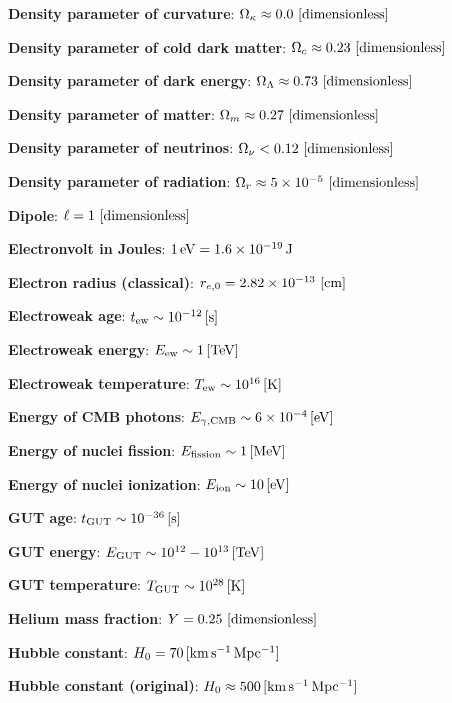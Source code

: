 \documentclass[a4paper,10pt]{article}
\begin{document}
{\noindent}\textbf{Density parameter of curvature}: $\Omega_\kappa \approx 0.0 ~ [{\rm dimensionless}]$

{\noindent}\textbf{Density parameter of cold dark matter}: $\Omega_c \approx 0.23 ~ [{\rm dimensionless}]$

{\noindent}\textbf{Density parameter of dark energy}: $\Omega_\Lambda \approx 0.73 ~ [{\rm dimensionless}]$

{\noindent}\textbf{Density parameter of matter}: $\Omega_m \approx 0.27 ~ [{\rm dimensionless}]$

{\noindent}\textbf{Density parameter of neutrinos}: $\Omega_\nu < 0.12 ~ [{\rm dimensionless}]$

{\noindent}\textbf{Density parameter of radiation}: $\Omega_r \approx 5\times10^{-5} ~ [{\rm dimensionless}]$

{\noindent}\textbf{Dipole}: $\ell=1 ~ [{\rm dimensionless}]$

{\noindent}\textbf{Electronvolt in Joules}: $1\,{\rm eV} = 1.6\times10^{-19}\,{\rm J}$

{\noindent}\textbf{Electron radius (classical)}: $r_{e,0}=2.82\times10^{-13} ~ [{\rm cm}]$

{\noindent}\textbf{Electroweak age}: $t_\mathrm{ew} \sim 10^{-12}\,[{\rm s}]$

{\noindent}\textbf{Electroweak energy}: $E_\mathrm{ew} \sim 1\,[{\rm TeV}]$

{\noindent}\textbf{Electroweak temperature}: $T_\mathrm{ew} \sim 10^{16}\,[{\rm K}]$

{\noindent}\textbf{Energy of CMB photons}: $E_{\gamma,\mathrm{CMB}} \sim 6\times10^{-4}\,[{\rm eV}]$

{\noindent}\textbf{Energy of nuclei fission}: $E_\mathrm{fission} \sim 1\,[{\rm MeV}]$

{\noindent}\textbf{Energy of nuclei ionization}: $E_\mathrm{ion} \sim 10\,[{\rm eV}]$

{\noindent}\textbf{GUT age}: $t_\mathrm{GUT} \sim 10^{-36}\,[{\rm s}]$

{\noindent}\textbf{GUT energy}: $E_\mathrm{GUT} \sim 10^{12}-10^{13}\,[{\rm TeV}]$

{\noindent}\textbf{GUT temperature}: $T_\mathrm{GUT} \sim 10^{28}\,[{\rm K}]$

{\noindent}\textbf{Helium mass fraction}: $Y = 0.25 ~ [{\rm dimensionless}]$

{\noindent}\textbf{Hubble constant}: $H_0 = 70\,[{\rm km\,s^{-1}\,Mpc^{-1}}]$

{\noindent}\textbf{Hubble constant (original)}: $H_0 \approx 500\,[{\rm km\,s^{-1}\,Mpc^{-1}}]$
\end{document}
